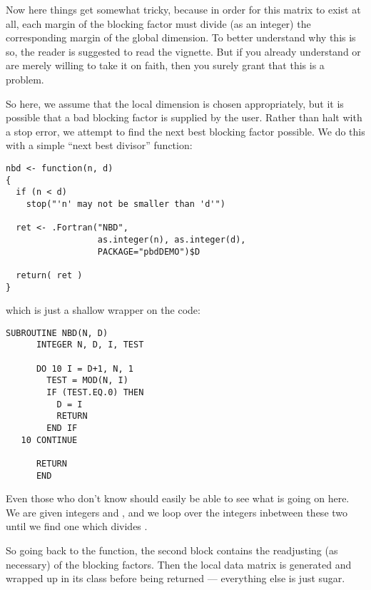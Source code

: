 Now here things get somewhat tricky, because in order for this matrix to exist at all, each margin of the blocking factor must divide (as an integer) the corresponding margin of the global dimension.  To better understand why this is so, the reader is suggested to read the  vignette.  But if you already understand or are merely willing to take it on faith, then you surely grant that this is a problem.

So here, we assume that the local dimension is chosen appropriately, but it is possible that a bad blocking factor is supplied by the user.  Rather than halt with a stop error, we attempt to find the next best blocking factor possible.  We do this with a simple ``next best divisor'' function:

\begin{lstlisting}[language=rr,title=nbd()]
nbd <- function(n, d)
{
  if (n < d)
    stop("'n' may not be smaller than 'd'")
  
  ret <- .Fortran("NBD", 
                  as.integer(n), as.integer(d),
                  PACKAGE="pbdDEMO")$D
  
  return( ret )
}
\end{lstlisting}

which is just a shallow wrapper on the  code:

\begin{lstlisting}[language=ft,title=NBD]
      SUBROUTINE NBD(N, D)
      INTEGER N, D, I, TEST
      
      DO 10 I = D+1, N, 1
        TEST = MOD(N, I)
        IF (TEST.EQ.0) THEN
          D = I
          RETURN
        END IF
   10 CONTINUE
      
      RETURN
      END
\end{lstlisting}

Even those who don't know  should easily be able to see what is going on here.  We are given integers  and , and we loop over the integers inbetween these two until we find one which divides .

So going back to the  function, the second  block contains the readjusting (as necessary) of the blocking factors.  Then the local data matrix is generated and wrapped up in its class before being returned --- everything else is just sugar.